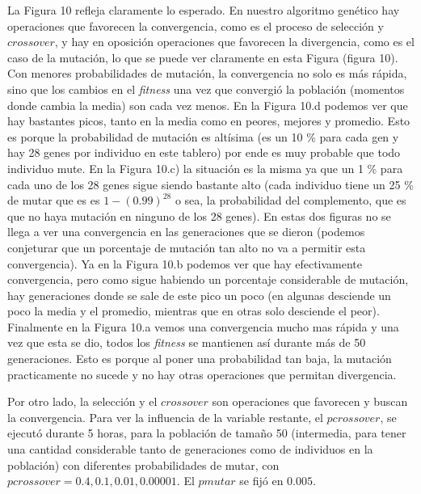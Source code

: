 \documentclass[A4paper,oneside,fleqn,11pt]{article}
\theoremstyle{definition}
\begin{document}
La Figura 10 refleja claramente lo esperado. En nuestro algoritmo genético hay operaciones que favorecen la convergencia, como es el proceso de selección y $crossover$, y hay en oposición operaciones que favorecen la divergencia, como es el caso de la mutación, lo que se puede ver claramente en esta Figura (figura 10). Con menores probabilidades de mutación, la convergencia no solo es más rápida, sino que los cambios en el \textit{fitness} una vez que convergió la población (momentos donde cambia la media) son cada vez menos. En la Figura 10.d podemos ver que hay bastantes picos, tanto en la media como en peores, mejores y promedio. Esto es porque la probabilidad de mutación es altísima (es un 10 \% para cada gen y hay 28 genes por individuo en este tablero) por ende es muy probable que todo individuo mute. En la Figura 10.c) la situación es la misma ya que un 1 \% para cada uno de los 28 genes sigue siendo bastante alto (cada individuo tiene un 25 \% de mutar que es es $1- (0.99)^{28}$ o sea, la probabilidad del complemento, que es que no haya mutación en ninguno de los 28 genes). En estas dos figuras no se llega a ver una convergencia en las generaciones que se dieron (podemos conjeturar que un porcentaje de mutación tan alto no va a permitir esta convergencia). Ya en la Figura 10.b podemos ver que hay efectivamente convergencia, pero como sigue habiendo un porcentaje considerable de mutación, hay generaciones donde se sale de este pico un poco (en algunas desciende un poco la media y el promedio, mientras que en otras solo desciende el peor). Finalmente en la Figura 10.a vemos una convergencia mucho mas rápida y una vez que esta se dio, todos los \textit{fitness} se mantienen así durante más de 50 generaciones. Esto es porque al poner una probabilidad tan baja, la mutación practicamente no sucede y no hay otras operaciones que permitan divergencia.

Por otro lado, la selección y el $crossover$ son operaciones que favorecen y buscan la convergencia. Para ver la influencia de la variable restante, el $pcrossover$, se ejecutó durante 5 horas, para la población de tamaño 50 (intermedia, para tener una cantidad considerable tanto de generaciones como de individuos en la población) con diferentes probabilidades de mutar, con $pcrossover= 0.4, 0.1, 0.01, 0.00001$.  El $pmutar$ se fijó en $0.005$.
\end{document}
